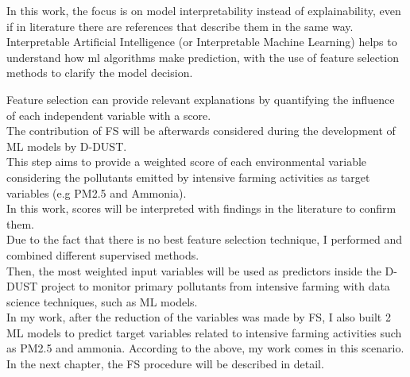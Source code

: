 In this work, the focus is on model interpretability instead of explainability, even if in literature there are references that describe them in the same way.\\
Interpretable Artificial Intelligence (or Interpretable Machine Learning) helps to understand how \acrshort{ml} algorithms make prediction, with the use of feature selection methods to clarify the model decision.
\par
Feature selection can provide relevant explanations by quantifying the influence of each independent variable with a score.\\
The contribution of FS will be afterwards considered during the development of ML models by D-DUST.\\
This step aims to provide a weighted score of each environmental variable considering the pollutants emitted by intensive farming activities as target variables (e.g PM2.5 and Ammonia). \\
In this work, scores will be interpreted with findings in the literature to confirm them.\\
Due to the fact that there is no best feature selection technique, I performed and combined different supervised methods. \\
Then, the most weighted input variables will be used as predictors inside the D-DUST project to monitor primary pollutants from intensive farming with data science techniques, such as ML models.\\
In my work, after the reduction of the variables was made by FS, I also built 2 ML models to predict target variables related to intensive farming activities such as PM2.5 and ammonia.
\bigbreak
According to the above, my work comes in this scenario.
In the next chapter, the FS procedure will be described in detail.
\\

